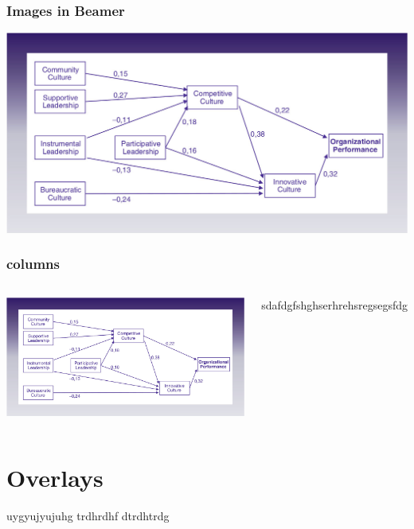\documentclass[aspectratio=169]{beamer}
\begin{document}
\begin{frame}
\frametitle{Images in Beamer}

\includegraphics[scale=.25]{"./image/OB/Ogbonna_Harris.jpg"}

\end{frame}

\begin{frame}
\frametitle{columns}

\begin{columns}

\includegraphics[scale=.1]{"./image/OB/Ogbonna_Harris.jpg"}


sdafdgfshghserhrehsregsegsfdg

\end{columns}

\end{frame}
\section{Overlays}

\begin{frame}
uygyujyujuhg
trdhrdhf
dtrdhtrdg


\end{frame}
\end{document}
